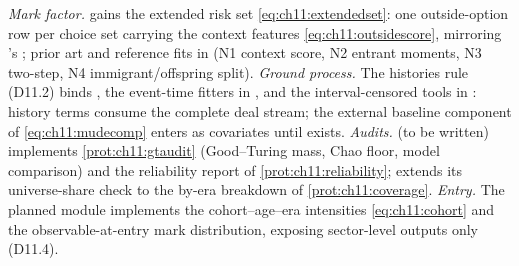 \begin{codehooks}
\emph{Mark factor.}  gains the extended risk
set \cref{eq:ch11:extendedset}: one outside-option row per choice set
carrying the context features \cref{eq:ch11:outsidescore}, mirroring
's
; prior art and
reference fits in 
(N1 context score, N2 entrant moments, N3 two-step, N4
immigrant/offspring split).
\emph{Ground process.} The histories rule (D11.2) binds
, the event-time fitters in
, and the interval-censored tools in
: history terms consume the complete deal stream; the
external baseline component of \cref{eq:ch11:mudecomp} enters as
covariates until  exists.
\emph{Audits.}  (to be written) implements
\cref{prot:ch11:gtaudit} (Good--Turing mass, Chao floor, model
comparison) and the reliability report of \cref{prot:ch11:reliability};
 extends its universe-share check to the by-era
breakdown of \cref{prot:ch11:coverage}.
\emph{Entry.} The planned  module implements the
cohort--age--era intensities \cref{eq:ch11:cohort} and the
observable-at-entry mark distribution, exposing sector-level outputs
only (D11.4).
\end{codehooks}
